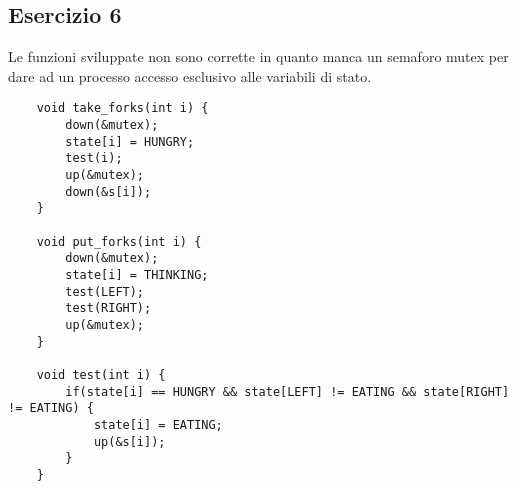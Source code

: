 \documentclass[12pt]{article}
\begin{document}
\subsection*{Esercizio 6}
Le funzioni sviluppate non sono corrette in quanto manca un semaforo mutex per dare ad un processo accesso esclusivo alle 
variabili di stato.
\begin{lstlisting}
    void take_forks(int i) {
        down(&mutex);
        state[i] = HUNGRY;
        test(i);
        up(&mutex);
        down(&s[i]);
    }

    void put_forks(int i) {
        down(&mutex);
        state[i] = THINKING;
        test(LEFT);
        test(RIGHT);
        up(&mutex);
    }

    void test(int i) {
        if(state[i] == HUNGRY && state[LEFT] != EATING && state[RIGHT] != EATING) {
            state[i] = EATING;
            up(&s[i]);
        }
    }
\end{lstlisting}
\end{document}
